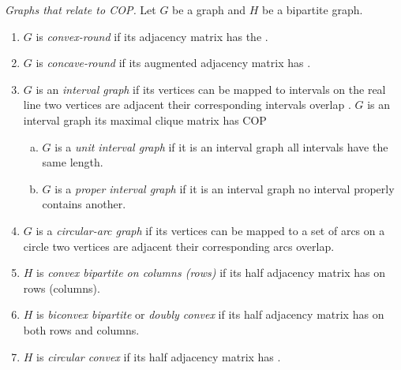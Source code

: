 \begin{definition}{\emph{Graphs that relate to
      COP.\cite[Def.~2.5]{d08phd}}} %
  \label{def:graphwithcop} %
  Let $G$ be a graph and $H$ be a bipartite graph.
  \begin{enumerate}
  \item $G$ is \emph{convex-round} if its adjacency matrix has the
    \CROP.
  \item \label{def::concave-round} $G$ is \emph{concave-round} if its
    augmented adjacency matrix has \CROP. 
  \item $G$ is an \emph{interval graph} if its vertices can be mapped
    to intervals on the real line \stt two vertices are adjacent \iff
    their corresponding intervals overlap .
    $G$ is an interval graph \iff its maximal clique matrix has COP
    \cite{fg65}
    \begin{enumerate}[a.]
    \item $G$ is a \emph{unit interval graph} if it is an interval
      graph \stt all intervals have the same length.\endnotemark[2]
    \item $G$ is a \emph{proper interval graph} if it is an interval
      graph \stt no interval properly contains another. 
    \end{enumerate}
 \item $G$ is a \emph{circular-arc graph} if its vertices can be
    mapped to a set of arcs on a circle \stt two vertices are adjacent
    \iff their corresponding arcs overlap.
  \item $H$ is \emph{convex bipartite on columns (rows)} if its half
    adjacency matrix has \COP on rows (columns).%
    \label{def::convexbi}
  \item $H$ is \emph{biconvex bipartite} or \emph{doubly
      convex}\cite{yc95} if its half adjacency matrix has \COP on both
    rows and columns.
  \item $H$ is \emph{circular convex} if its half adjacency matrix has
    \CROP.
  \end{enumerate}
\end{definition}

